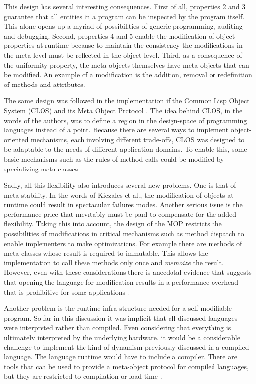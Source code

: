 This design has several interesting consequences. First of all, properties 2 and 3 guarantee that all entities in a program can be
inspected by the program itself. This alone opens up a myriad of possibilities of generic programming, auditing and debugging.
Second, properties 4 and 5 enable the modification of object properties at runtime because to maintain the consistency the modifications
in the meta-level must be reflected in the object level. Third, as a consequence of the uniformity property, the meta-objects themselves
have meta-objects that can be modified. An example of a modification is the addition, removal or redefinition of methods and attributes.

The same design was followed in the implementation if the Common Lisp Object System (CLOS) and its Meta Object Protocol \cite{Kiczales}.
The idea behind CLOS, in the words of the authors, was to define a region in the design-space of programming languages instead of
a point. Because there are several ways to implement object-oriented mechanisms, each involving different trade-offs, CLOS was
designed to be adaptable to the needs of different application domains. To enable this, some basic mechanisms such as the
rules of method calls could be modified by specializing meta-classes.

Sadly, all this flexibility also introduces several new problems. One is that of meta-stability. In the words of Kiczales et al.,
the modification of objects at runtime could result in spectacular failures modes. Another serious issue is the performance price
that inevitably must be paid to compensate for the added flexibility. Taking this into account, the design of the MOP restricts
the possibilities of modifications in critical mechanisms such as method dispatch to enable implementers to make optimizations.
For example there are methods of meta-classes whose result is required to immutable. This allows the implementation to call
these methods only once and \emph{memoize} the result. However, even with these considerations there is anecdotal evidence
that suggests that opening the language for modification results in a performance overhead that is prohibitive for some applications \cite{Lee}.

Another problem is the runtime infra-structure needed for a self-modifiable program. So far in this discussion it was implicit
that all discussed languages were interpreted rather than compiled. Even considering that everything is ultimately interpreted
by the underlying hardware, it would be a considerable challenge to implement the kind of dynamism previously discussed in
a compiled language. The language runtime would have to include a compiler. There are tools that can be used to provide
a meta-object protocol for compiled languages, but they are restricted to compilation or load time \cite{Chiba95} \cite{Chiba2000}.

